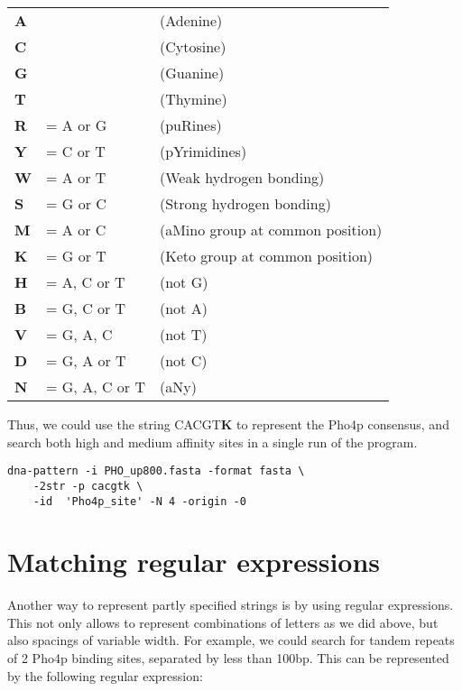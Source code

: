 \begin{tabular}{lll}
\textbf{A} &  & (Adenine) \\
\textbf{C} &  & (Cytosine) \\
\textbf{G} &  & (Guanine) \\
\textbf{T} &  & (Thymine) \\
\textbf{R} & = A or G & (puRines) \\
\textbf{Y} & = C or T & (pYrimidines) \\
\textbf{W} & = A or T & (Weak hydrogen bonding) \\
\textbf{S} & = G or C & (Strong hydrogen bonding) \\
\textbf{M} & = A or C & (aMino group at common position) \\
\textbf{K} & = G or T & (Keto group at common position) \\
\textbf{H} & = A, C or T & (not G) \\
\textbf{B} & = G, C or T & (not A) \\
\textbf{V} & = G, A, C & (not T) \\
\textbf{D} & = G, A or T & (not C) \\
\textbf{N} & = G, A, C or T & (aNy) \\
\end{tabular}

Thus, we could use the string CACGT\textbf{K} to represent the Pho4p
consensus, and search both high and medium affinity sites in a single
run of the program.

{\color{Blue} \begin{footnotesize} 
\begin{verbatim}
dna-pattern -i PHO_up800.fasta -format fasta \
    -2str -p cacgtk \
    -id  'Pho4p_site' -N 4 -origin -0
\end{verbatim} \end{footnotesize}
}

\section{Matching regular expressions}

Another way to represent partly specified strings is by using regular
expressions. This not only allows to represent combinations of letters
as we did above, but also spacings of variable width. For example, we
could search for tandem repeats of 2 Pho4p binding sites, separated by
less than 100bp. This can be represented by the following regular expression: 

